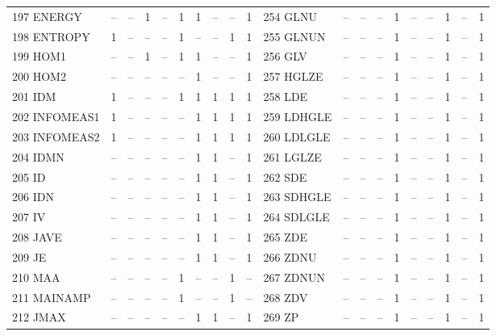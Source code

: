 \documentclass[sn-mathphys,Numbered]{sn-jnl}%
\theoremstyle{thmstyleone}%
\theoremstyle{thmstyletwo}%
\theoremstyle{thmstylethree}%
\begin{document}
\begin{table}[!hbt]
\begin{tiny}
\begin{tabular} { l  c  c  c  c  c  c  c  c  c    l  c  c  c  c  c  c  c  c  c }
 197 ENERGY & -- &  -- &  1 &  -- &  1 &  1 &  -- & -- & 1 &  254 GLNU & -- &  -- &  -- &  1 &  -- &  -- &  1 & -- &  1 \\
 198 ENTROPY & 1 &  -- &  -- &  -- &  1 &  -- &  -- & 1 & 1 &  255 GLNUN & -- &  -- &  -- &  1 &  -- &  -- &  1 & -- &  1 \\  %
 199 HOM1 & -- &  -- &  1 &  -- &  1 &  1 &  -- & -- & 1 &  256 GLV & -- &  -- &  -- &  1 &  -- &  -- &  1 & -- &  1 \\
 200 HOM2 & -- &  -- &  -- &  -- &  -- &  1 &  -- & -- & 1 &  257 HGLZE & -- &  -- &  -- &  1 &  -- &  -- &  1 & -- &  1 \\ %
 201 IDM & 1 &  -- &  -- &  -- &  1 &  1 &  1 & 1 & 1 &  258 LDE & -- &  -- &  -- &  1 &  -- &  -- &  1 & -- &  1 \\
 202 INFOMEAS1 & 1 &  -- &  -- &  -- &  -- &  1 &  1 & 1 & 1 &  259 LDHGLE & -- &  -- &  -- &  1 &  -- &  -- &  1 & -- &  1 \\
 203 INFOMEAS2 & 1 &  -- &  -- &  -- &  -- &  1 &  1 & 1 & 1 &  260 LDLGLE & -- &  -- &  -- &  1 &  -- &  -- &  1 & -- &  1 \\
 204 IDMN & -- &  -- &  -- &  -- &  -- &  1 &  1 & -- & 1 &  261 LGLZE & -- &  -- &  -- &  1 &  -- &  -- &  1 & -- &  1 \\
 205 ID & -- &  -- &  -- &  -- &  -- &  1 &  1 & -- & 1 &  262 SDE & -- &  -- &  -- &  1 &  -- &  -- &  1 & -- &  1 \\
 206 IDN & -- &  -- &  -- &  -- &  -- &  1 &  1 & -- & 1 &  263 SDHGLE & -- &  -- &  -- &  1 &  -- &  -- &  1 & -- &  1 \\
 207 IV & -- &  -- &  -- &  -- &  -- &  1 &  1 & -- & 1 &  264 SDLGLE & -- &  -- &  -- &  1 &  -- &  -- &  1 & -- &  1 \\
 208 JAVE & -- &  -- &  -- &  -- &  -- &  1 &  1 & -- & 1 &  265 ZDE & -- &  -- &  -- &  1 &  -- &  -- &  1 & -- &  1 \\
 209 JE & -- &  -- &  -- &  -- &  -- &  1 &  1 & -- & 1 &  266 ZDNU & -- &  -- &  -- &  1 &  -- &  -- &  1 & -- &  1 \\
 210 MAA & -- &  -- &  -- &  -- &  1 &  -- &  -- & 1 & -- &  267 ZDNUN & -- &  -- &  -- &  1 &  -- &  -- &  1 & -- &  1 \\
 211 MAINAMP & -- &  -- &  -- &  -- &  1 &  -- &  -- & 1 & -- &  268 ZDV & -- &  -- &  -- &  1 &  -- &  -- &  1 & -- &  1 \\
 212 JMAX & -- &  -- &  -- &  -- &  -- &  1 &  1 & -- & 1 &  269 ZP & -- &  -- &  -- &  1 &  -- &  -- &  1 & -- &  1 \\

\end{tabular}
\end{tiny}
\end{table}
\end{document}
